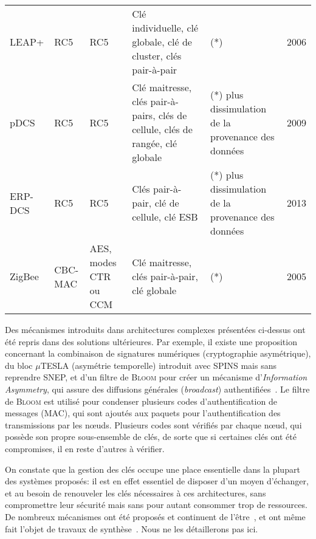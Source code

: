 \begin{table}[ht]
\begin{footnotesize}
\begin{tabular}{@{}m{} m{} m{} m{} m{} m{}@{}}
            LEAP+                   & RC5                          & RC5                                & Clé individuelle, clé globale, clé de cluster, clés pair-à-pair                & (*)                                                                                   & 2006\\
            pDCS                    & RC5                          & RC5                                & Clé maitresse, clés pair-à-pairs, clés de cellule, clés de rangée, clé globale & (*) plus dissimulation de la provenance des données                                   & 2009\\
            ERP-DCS                 & RC5                          & RC5                                & Clés pair-à-pair, clé de cellule, clé ESB                                      & (*) plus dissimulation de la provenance des données                                   & 2013\\
            ZigBee                  & CBC-MAC                      & AES, modes CTR ou CCM              & Clé maitresse, clés pair-à-pair, clé globale                                   & (*)                                                                                   & 2005\\
            \bottomrule
        \end{tabular}
    \end{footnotesize}
\end{table}

Des mécanismes introduits dans architectures complexes présentées ci-dessus ont été repris dans des solutions ultérieures.
Par exemple, il existe une proposition concernant la combinaison de signatures numériques (cryptographie asymétrique), du bloc $\mu$TESLA (asymétrie temporelle) introduit avec SPINS mais sans reprendre SNEP, et d'un filtre de \textsc{Bloom} pour créer un mécanisme d'\textit{Information Asymmetry}, qui assure des diffusions générales (\textit{broadcast}) authentifiées~\cite{SLS10}.
Le filtre de \textsc{Bloom} est utilisé pour condenser plusieurs codes d'authentification de messages (MAC), qui sont ajoutés aux paquets pour l'authentification des transmissions par les nœuds.
Plusieurs codes sont vérifiés par chaque nœud, qui possède son propre sous-ensemble de clés, de sorte que si certaines clés ont été compromises, il en reste d'autres à vérifier.

On constate que la gestion des clés occupe une place essentielle dans la plupart des systèmes proposés: il est en effet essentiel de disposer d'un moyen d'échanger, et au besoin de renouveler les clés nécessaires à ces architectures, sans compromettre leur sécurité mais sans pour autant consommer trop de ressources.
De nombreux mécanismes ont été proposés et continuent de l'être~\cite{DSK10,BSK13}, et ont même fait l'objet de travaux de synthèse~\cite{HWMRKP06,XRSDHG07}.
Nous ne les détaillerons pas ici.


